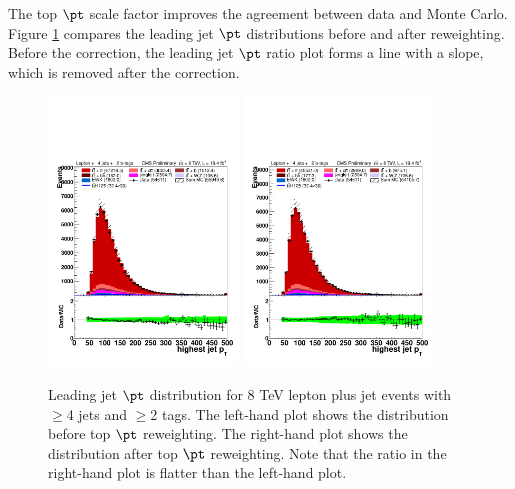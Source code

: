 \par The top $\pt$ scale factor improves the agreement
between data and Monte Carlo. Figure \ref{fig:topPtBeforeAfter}
compares the leading jet $\pt$ distributions before and after
reweighting. Before the correction, the
leading jet $\pt$ ratio plot forms a line with a slope, which is
removed after the correction. 

\begin{figure}[hbtp]
 \begin{center}
   \includegraphics[width=0.45\textwidth]{Figures/Analysis_2_Diagrams/LJ_plots_lep/4j2t/lep_jet_pt_1_noTopPt_4j2t_cumulative_wRatio_lin.pdf}
   \includegraphics[width=0.45\textwidth]{Figures/Analysis_2_Diagrams/LJ_plots_lep/4j2t/lep_jet_pt_1_4j2t_cumulative_wRatio_lin.pdf}
   \caption{Leading jet $\pt$ distribution for 8 TeV lepton plus jet events with
   $\geq$4 jets and $\geq$2 tags. The left-hand plot shows the
   distribution before top $\pt$ reweighting. The right-hand plot shows the
   distribution after top $\pt$ reweighting. Note that the ratio in the right-hand
   plot is flatter than the left-hand plot.}
   \label{fig:topPtBeforeAfter}
   \end{center}
\end{figure}


